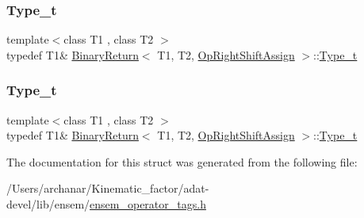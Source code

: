 \mbox{\label{structBinaryReturn_3_01T1_00_01T2_00_01OpRightShiftAssign_01_4_a4f80fa9e1ec9a2dfe91aa4777336c606}} 
\subsubsection{\texorpdfstring{Type\_t}{Type\_t}\hspace{0.1cm}{\footnotesize\ttfamily [2/3]}}
{\footnotesize\ttfamily template$<$class T1 , class T2 $>$ \\
typedef T1\& \mbox{\hyperlink{structBinaryReturn}{Binary\+Return}}$<$ T1, T2, \mbox{\hyperlink{structOpRightShiftAssign}{Op\+Right\+Shift\+Assign}} $>$\+::\mbox{\hyperlink{structBinaryReturn_3_01T1_00_01T2_00_01OpRightShiftAssign_01_4_a4f80fa9e1ec9a2dfe91aa4777336c606}{Type\+\_\+t}}}

\mbox{\label{structBinaryReturn_3_01T1_00_01T2_00_01OpRightShiftAssign_01_4_a4f80fa9e1ec9a2dfe91aa4777336c606}} 
\subsubsection{\texorpdfstring{Type\_t}{Type\_t}\hspace{0.1cm}{\footnotesize\ttfamily [3/3]}}
{\footnotesize\ttfamily template$<$class T1 , class T2 $>$ \\
typedef T1\& \mbox{\hyperlink{structBinaryReturn}{Binary\+Return}}$<$ T1, T2, \mbox{\hyperlink{structOpRightShiftAssign}{Op\+Right\+Shift\+Assign}} $>$\+::\mbox{\hyperlink{structBinaryReturn_3_01T1_00_01T2_00_01OpRightShiftAssign_01_4_a4f80fa9e1ec9a2dfe91aa4777336c606}{Type\+\_\+t}}}



The documentation for this struct was generated from the following file\+:\begin{DoxyCompactItemize}
\item 
/\+Users/archanar/\+Kinematic\+\_\+factor/adat-\/devel/lib/ensem/\mbox{\hyperlink{adat-devel_2lib_2ensem_2ensem__operator__tags_8h}{ensem\+\_\+operator\+\_\+tags.\+h}}\end{DoxyCompactItemize}
